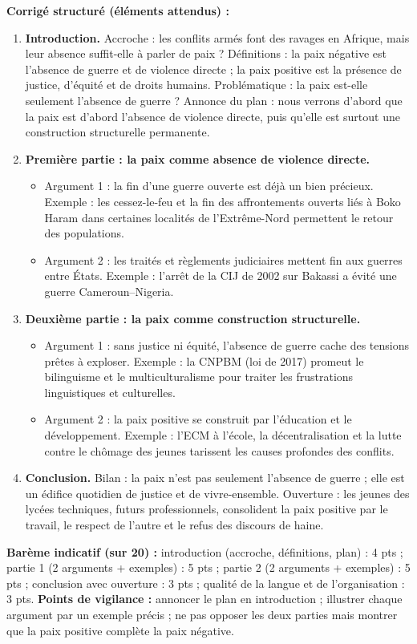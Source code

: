 \documentclass[11pt]{article}
\newcommand{\cle}[1]{{\popxbold\color{popdark}#1}}
\begin{document}
\begin{corrige}
\textbf{Corrigé structuré (éléments attendus) :}
\begin{enumerate}
\item \textbf{Introduction.} Accroche : les conflits armés font des ravages en Afrique, mais leur absence suffit-elle à parler de paix ? Définitions : la \cle{paix négative} est l'absence de guerre et de violence directe ; la \cle{paix positive} est la présence de justice, d'équité et de droits humains. Problématique : la paix est-elle seulement l'absence de guerre ? Annonce du plan : nous verrons d'abord que la paix est d'abord l'absence de violence directe, puis qu'elle est surtout une construction structurelle permanente.
\item \textbf{Première partie : la paix comme absence de violence directe.}
\begin{itemize}
\item Argument 1 : la fin d'une guerre ouverte est déjà un bien précieux. Exemple : les cessez-le-feu et la fin des affrontements ouverts liés à Boko Haram dans certaines localités de l'Extrême-Nord permettent le retour des populations.
\item Argument 2 : les traités et règlements judiciaires mettent fin aux guerres entre États. Exemple : l'arrêt de la CIJ de 2002 sur Bakassi a évité une guerre Cameroun--Nigeria.
\end{itemize}
\item \textbf{Deuxième partie : la paix comme construction structurelle.}
\begin{itemize}
\item Argument 1 : sans justice ni équité, l'absence de guerre cache des tensions prêtes à exploser. Exemple : la CNPBM (loi de 2017) promeut le bilinguisme et le multiculturalisme pour traiter les frustrations linguistiques et culturelles.
\item Argument 2 : la paix positive se construit par l'éducation et le développement. Exemple : l'ECM à l'école, la décentralisation et la lutte contre le chômage des jeunes tarissent les causes profondes des conflits.
\end{itemize}
\item \textbf{Conclusion.} Bilan : la paix n'est pas seulement l'absence de guerre ; elle est un édifice quotidien de justice et de vivre-ensemble. Ouverture : les jeunes des lycées techniques, futurs professionnels, consolident la paix positive par le travail, le respect de l'autre et le refus des discours de haine.
\end{enumerate}
\textbf{Barème indicatif (sur 20) :} introduction (accroche, définitions, plan) : 4 pts ; partie 1 (2 arguments + exemples) : 5 pts ; partie 2 (2 arguments + exemples) : 5 pts ; conclusion avec ouverture : 3 pts ; qualité de la langue et de l'organisation : 3 pts.
\textbf{Points de vigilance :} annoncer le plan en introduction ; illustrer chaque argument par un exemple précis ; ne pas opposer les deux parties mais montrer que la paix positive complète la paix négative.
\end{corrige}
\end{document}
